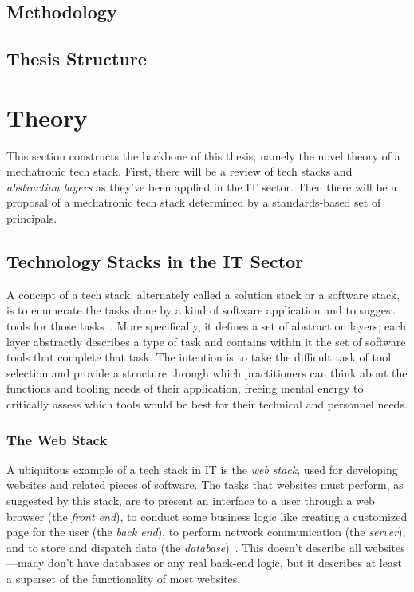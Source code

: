 \documentclass[english,12pt,a4paper,pdftex,eng,utf8]{aaltothesis}
\begin{document}
\lipsum[1-3]

\subsection{Methodology}

\lipsum[1-3]

\subsection{Thesis Structure}

\lipsum[1]

\clearpage


\section{Theory}

This section constructs the backbone of this thesis, namely the novel theory of a mechatronic tech stack.  First, there will be a review of tech stacks and {\it abstraction layers\/} as they've been applied in the IT sector.  Then there will be a proposal of a mechatronic tech stack determined by a standards-based set of principals.

\subsection{Technology Stacks in the IT Sector}

A concept of a tech stack, alternately called a solution stack or a software stack, is to enumerate the tasks done by a kind of software application and to suggest tools for those tasks~\cite{PranamStack2017}.  More specifically, it defines a set of abstraction layers; each layer abstractly describes a type of task and contains within it the set of software tools that complete that task.  The intention is to take the difficult task of tool selection and provide a structure through which practitioners can think about the functions and tooling needs of their application, freeing mental energy to critically assess which tools would be best for their technical and personnel needs.

\subsubsection{The Web Stack}

A ubiquitous example of a tech stack in IT is the {\it web stack}, used for developing websites and related pieces of software.  The tasks that websites must perform, as suggested by this stack, are to present an interface to a user through a web browser (the {\it front end\/}), to conduct some business logic like creating a customized page for the user (the {\it back end\/}), to perform network communication (the {\it server\/}), and to store and dispatch data (the {\it database\/})~\cite{PranamStack2017}.  This doesn't describe all websites---many don't have databases or any real back-end logic, but it describes at least a superset of the functionality of most websites.
\end{document}
